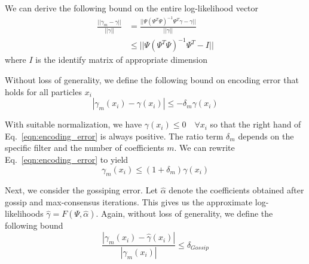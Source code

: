 \documentclass[10pt,letterpaper,final]{article}
\begin{document}
We can derive the following bound on the entire log-likelihood vector
\begin{align}
\frac{||\gamma_{m} - \gamma||}{||\gamma||} &= \frac{||\Psi(\Psi^T\Psi)^{-1}\Psi^T\gamma - \gamma||}{||\gamma||} \nonumber \\
&\leq ||\Psi(\Psi^T\Psi)^{-1}\Psi^T-I||
\label{eqn:encoding_error_vector}
\end{align}
where $I$ is the identify matrix of appropriate dimension

Without loss of generality, we define the following bound on encoding error that holds for all particles $x_i$
\begin{equation}
|\gamma_{m}(x_i) - \gamma(x_i)|\leq -\delta_m\gamma(x_i)
\label{eqn:encoding_error}
\end{equation}

With suitable normalization, we have $\gamma(x_i)\leq 0 \quad \forall x_i$ so that the right hand of Eq.~\eqref{eqn:encoding_error} is always positive. 
The ratio term $\delta_m$ depends on the specific filter and the number of coefficients $m$. We can rewrite Eq.~\eqref{eqn:encoding_error} to yield
\begin{equation}
\gamma_m(x_i) \leq (1+\delta_m)\gamma(x_i)
\end{equation}

%

Next, we consider the gossiping error. Let $\hat{\alpha}$ denote the coefficients obtained after gossip and max-consensus iterations. This gives us the approximate log-likelihoods $\hat{\gamma} = F(\Psi, \hat{\alpha})$. Again, without loss of generality, we define the following bound
\begin{equation}
\frac{|\gamma_m(x_i)-\hat{\gamma}(x_i)|}{|\gamma_m(x_i)|} \leq \delta_{Gossip}
\label{eqn:gossiping_error}
\end{equation}
\end{document}
